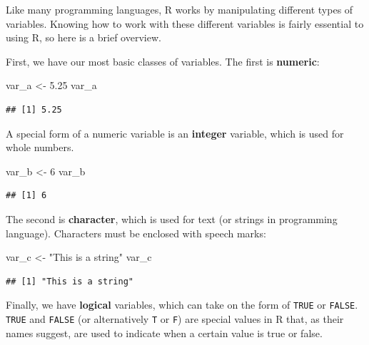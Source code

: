 \documentclass[
]{book}
\newenvironment{Shaded}{\begin{snugshade}}{\end{snugshade}}
\newcommand{\DecValTok}[1]{\textcolor[rgb]{0.00,0.00,0.81}{#1}}
\newcommand{\FloatTok}[1]{\textcolor[rgb]{0.00,0.00,0.81}{#1}}
\newcommand{\NormalTok}[1]{#1}
\newcommand{\OtherTok}[1]{\textcolor[rgb]{0.56,0.35,0.01}{#1}}
\newcommand{\StringTok}[1]{\textcolor[rgb]{0.31,0.60,0.02}{#1}}
\begin{document}
Like many programming languages, R works by manipulating different types of variables. Knowing how to work with these different variables is fairly essential to using R, so here is a brief overview.

First, we have our most basic classes of variables. The first is \textbf{numeric}:

\begin{Shaded}
\begin{Highlighting}[]
\NormalTok{var\_a }\OtherTok{\textless{}{-}} \FloatTok{5.25}
\NormalTok{var\_a}
\end{Highlighting}
\end{Shaded}

\begin{verbatim}
## [1] 5.25
\end{verbatim}

A special form of a numeric variable is an \textbf{integer} variable, which is used for whole numbers.

\begin{Shaded}
\begin{Highlighting}[]
\NormalTok{var\_b }\OtherTok{\textless{}{-}} \DecValTok{6}
\NormalTok{var\_b}
\end{Highlighting}
\end{Shaded}

\begin{verbatim}
## [1] 6
\end{verbatim}

The second is \textbf{character}, which is used for text (or strings in programming language). Characters must be enclosed with speech marks:

\begin{Shaded}
\begin{Highlighting}[]
\NormalTok{var\_c }\OtherTok{\textless{}{-}} \StringTok{"This is a string"}
\NormalTok{var\_c}
\end{Highlighting}
\end{Shaded}

\begin{verbatim}
## [1] "This is a string"
\end{verbatim}

Finally, we have \textbf{logical} variables, which can take on the form of \texttt{TRUE} or \texttt{FALSE}. \texttt{TRUE} and \texttt{FALSE} (or alternatively \texttt{T} or \texttt{F}) are special values in R that, as their names suggest, are used to indicate when a certain value is true or false.
\end{document}
